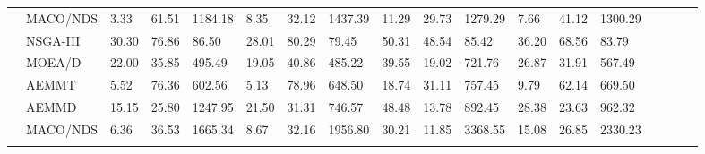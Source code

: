 \begin{sidewaystable}[]
\begin{tabular}{clV{5}l|l|lV{5}l|l|lV{5}l|l|lV{5}l|l|l|}
		 & MACO/NDS & 3.33 & 61.51 & 1184.18 & 8.35 & 32.12 & 1437.39 & 11.29 & 29.73 & 1279.29 & 7.66 & 41.12 & 1300.29\\ 
		 & NSGA-III & 30.30 & 76.86 & 86.50 & 28.01 & 80.29 & 79.45 & 50.31 & 48.54 & 85.42 & 36.20 & 68.56 & 83.79\\ 
		 & MOEA/D & 22.00 & 35.85 & 495.49 & 19.05 & 40.86 & 485.22 & 39.55 & 19.02 & 721.76 & 26.87 & 31.91 & 567.49\\ 
		 & AEMMT & 5.52 & 76.36 & 602.56 & 5.13 & 78.96 & 648.50 & 18.74 & 31.11 & 757.45 & 9.79 & 62.14 & 669.50\\ 
		 & AEMMD & 15.15 & 25.80 & 1247.95 & 21.50 & 31.31 & 746.57 & 48.48 & 13.78 & 892.45 & 28.38 & 23.63 & 962.32\\ 
		 & MACO/NDS & 6.36 & 36.53 & 1665.34 & 8.67 & 32.16 & 1956.80 & 30.21 & 11.85 & 3368.55 & 15.08 & 26.85 & 2330.23\\ 
	\end{tabular}
\end{sidewaystable}

